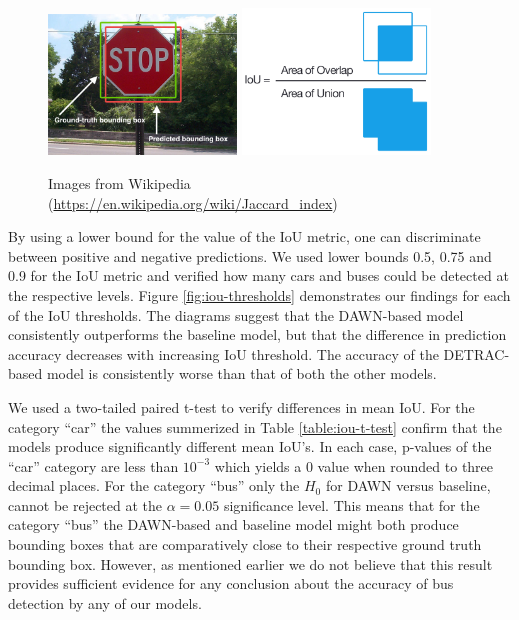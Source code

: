 \documentclass[]{article}
\begin{document}
	\begin{figure}[h]
		\centering
		\includegraphics[width=5cm]{Intersection_over_Union_-_object_detection_bounding_boxes.jpg}
		\includegraphics[width=5cm]{Intersection_over_Union_-_visual_equation.png}
		\caption{Images from Wikipedia \footnotesize{(\url{https://en.wikipedia.org/wiki/Jaccard_index})}}
		\label{fig:iou}
	\end{figure}
	
	By using a lower bound for the value of the IoU metric, one can discriminate between positive and negative predictions. We used lower bounds 0.5, 0.75 and 0.9 for the IoU metric and verified how many cars and buses could be detected at the respective levels. Figure \ref{fig:iou-thresholds} demonstrates our findings for each of the IoU thresholds. The diagrams suggest that the DAWN-based model consistently outperforms the baseline model, but that the difference in prediction accuracy decreases with increasing IoU threshold. The accuracy of the DETRAC-based model is consistently worse than that of both the other models. 
	
	We used a two-tailed paired t-test to verify differences in mean IoU. For the category ``car'' the values summerized in Table \ref{table:iou-t-test} confirm that the models produce significantly different mean IoU's. In each case, p-values of the ``car'' category are less than $10^{-3}$ which yields a $0$ value when rounded to three decimal places. For the category ``bus'' only the $H_0$ for DAWN versus baseline, cannot be rejected at the $\alpha = 0.05$ significance level. This means that for the category ``bus'' the DAWN-based and baseline model might both produce bounding boxes that are comparatively close to their respective ground truth bounding box. However, as mentioned earlier we do not believe that this result provides sufficient evidence for any conclusion about the accuracy of bus detection by any of our models.
	
\end{document}
